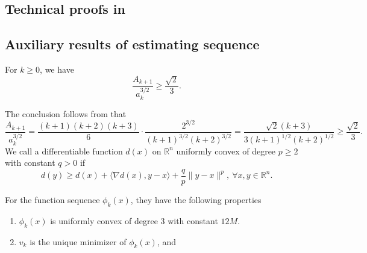 \documentclass[moor,sglanonrev]{informs4}
\begin{document}
%
%
%
\begin{APPENDICES}
    \SingleSpacedXI
    \section{Technical proofs in~}\label{sec.proof pre}
    \subsection{Auxiliary results of estimating sequence}
    \begin{lemma}
        \label{lem.magnitude a and A}
        For $k\geq 0$, we have
        \begin{equation}
            \label{eq.magnitude a and A}
            \frac{A_{k+1}}{a_k^{3/2}} \geq \frac{\sqrt{2}}{3}.
        \end{equation}
    \end{lemma}
    The conclusion follows from that
    $$\frac{A_{k+1}}{a_k^{3/2}}= \frac{(k+1)(k+2)(k+3)}{6}\cdot \frac{2^{3/2}}{(k+1)^{3/2}(k+2)^{3/2}} = \frac{\sqrt{2}(k+3)}{3(k+1)^{1/2}(k+2)^{1/2}} \geq \frac{\sqrt{2}}{3}.$$
    \Halmos \endproof
    We call a differentiable function $d(x)$ on $\mathbb{R}^n$ uniformly convex \cite[Section 4.2.2]{nesterov2018lectures} of degree $p\geq 2$ with constant $q>0$ if
    \begin{equation}
        \label{eq.uniformly convex of p}
        d(y)\geq d(x)+\langle \nabla d(x),y-x\rangle +\frac{q}{p}\|y-x\|^p, \ \forall x,y\in\mathbb{R}^n.
    \end{equation}
    \begin{lemma}
        \label{lem.property of phi}
        For the function sequence $\phi_k(x)$, they have the following properties
        \begin{enumerate}[label=(\roman*)]
            \item $\phi_k(x)$ is uniformly convex of degree $3$ with constant $12M$.
            \item $v_k$ is the unique minimizer of $\phi_k(x)$, and
                  \begin{equation}
                      \label{eq.phi_k phi_low}

\end{equation}
\end{enumerate}
\end{lemma}
\end{APPENDICES}
\end{document}

